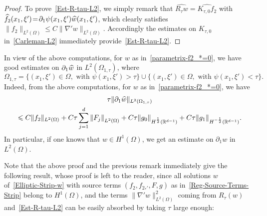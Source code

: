 \documentclass[10pt]{amsart}
\theoremstyle{definition}\newtheorem{defi}[theo]{Definition}\newtheorem{rema}[theo]{Remark}\newtheorem{exam}[theo]{Example}\newtheorem{exem}[theo]{Example}\newtheorem{nota}[theo]{Notation}
\newcommand*\R{\mathbb{R}}
\renewcommand{\leq}{\leqslant}
\renewcommand{\hat}{\widehat}
\let\oldhat\hat
\renewcommand*{\hat}[1]{\mathchoice{\widehat{#1}}{\widehat{#1}}{\oldhat{#1}}{\oldhat{#1}}}
\begin{document}
\begin{proof}
To prove~\eqref{Est-R-tau-L2}, we simply remark that $\widehat {R_\tau w}\! = \!\widehat {K_{\tau,0} f_2}$ with $\widehat f_2 (x_1, \xi')\! =\! \partial_1 \psi(x_1, \xi')\linebreak \widehat w(x_1, \xi')$, which clearly satisfies $\| f_2 \|_{L^2(\Omega)} \leq C \| \nabla' w\|_{L^2(\Omega)}$. Accordingly the estimates on $K_{\tau,0}$ in~\eqref{Carleman-L2} immediately provide~\eqref{Est-R-tau-L2}.
\end{proof}

In view of the above computations, for $w$ as in~\eqref{parametrix-f2_*=0}, we have good estimates on $\partial_1 \hat w$ in $L^2(\Omega_{1, \tau})$, where
\begin{equation}\label{Def-Omega-1-tau}
\Omega_{1,\tau} = \{ (x_1, \xi') \in \Omega,\text{ with } \psi(x_1, \xi') > \tau \}
\cup \{ (x_1, \xi') \in \Omega,\text{ with } \psi(x_1, \xi') < \tau \}.
\end{equation}
Indeed, from the above computations, for $w$ as in~\eqref{parametrix-f2_*=0}, we have
\begin{multline}\label{Est-d1-Hilbertian-Est}
\tau \| \partial_1 \hat w \|_{L^2(\Omega_{1, \tau})}\\
\leq C \| f_2 \|_{L^2(\Omega)}
+ C \tau \sum_{j = 1}^d \left\| F_j\right\|_{L^2(\Omega)}
+ C \tau \| g_0 \|_{H^{\frac{1}{2}}\left(\R^{d-1}\right)} + C\tau \| g_1\|_{H^{-\frac{1}{2}}\left(\R^{d-1}\right)}.
\end{multline}
In particular, if one knows that $w \in H^1(\Omega)$, we get an estimate on $\partial_1 w$ in $L^2(\Omega)$.

Note that the above proof and the previous remark immediately give the following result, whose proof is left to the reader, since all solutions $w$ of~\eqref{Elliptic-Strip-w} with source terms $(f_2, f_{2_*'},F,g)$ as in~\eqref{Reg-Source-Terms-Strip} belong to $H^1(\Omega)$, and the terms $\| \nabla' w\|_{L^2(\Omega)}^2$ coming from $R_\tau(w)$ and~\eqref{Est-R-tau-L2} can be easily absorbed by taking $\tau$ large enough:
\end{document}
